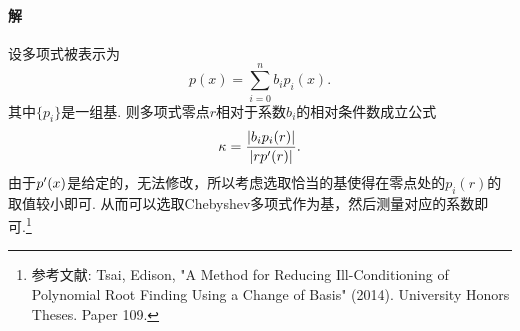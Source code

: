   \paragraph{解}
    设多项式被表示为
    \[
      p(x) = \sum_{i=0}^n b_ip_i(x).
    \]
    其中$\{p_i\}$是一组基. 则多项式零点$r$相对于系数$b_i$的相对条件数成立公式
    \[
      \kappa = \frac{|b_i p_i(r)|}{|rp^{\prime}(r)|}.
    \]
    由于$p^{\prime}(x)$是给定的，无法修改，所以考虑选取恰当的基使得在零点处的$p_i(r)$的
    取值较小即可. 从而可以选取Chebyshev多项式作为基，然后测量对应的系数即可.\footnote{
      参考文献: Tsai, Edison, "A Method for Reducing Ill-Conditioning of Polynomial
       Root Finding Using a Change of Basis" (2014). University Honors Theses. Paper 109.
    }



